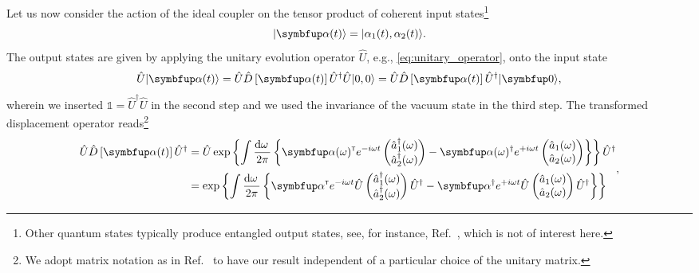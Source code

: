 Let us now consider the action of the ideal coupler on the tensor product of coherent input states\footnote{Other quantum states typically produce entangled output states, see, for instance, Ref.~\cite{Windhager2011}, which is not of interest here.}
\begin{equation}
	\ket*{\vb{\alpha}(t)}
	=
	\ket*{\alpha_1(t),\alpha_2(t)}
	.
\end{equation}
The output states are given by applying the unitary evolution operator $\hat{U}$, e.g., \cref{eq:unitary_operator}, onto the input state
\begin{equation}
	\hat{U}
	\ket*{\vb{\alpha}(t)}
	=
	\hat{U}
	\hat{D}\left[\vb{\alpha}(t)\right]
	\hat{U}^\dagger
	\hat{U}
	\ket*{0,0}
	=
	\hat{U}
	\hat{D}\left[\vb{\alpha}(t)\right]
	\hat{U}^\dagger
	\vacket
	,
\end{equation}
wherein we inserted $\mathbb{1}=\hat{U}^\dagger\hat{U}$ in the second step and we used the invariance of the vacuum state in the third step.
The transformed displacement operator reads\footnote{We adopt matrix notation as in Ref.~\cite[p.~206]{Vogel2006} to have our result independent of a particular choice of the unitary matrix.}
\begin{equation}
	\begin{split}
		\hat{U}
		\hat{D}\left[\vb{\alpha}(t)\right]
		\hat{U}^\dagger
		&=
		\hat{U}
		\exp\left\{
			\int\frac{\dd{\omega}}{2\pi}
			\left\{
				\vb{\alpha}(\omega)^\trans
				e^{-i\omega t}
				\begin{pmatrix}
					\hat{a}_1^\dagger(\omega) \\
					\hat{a}_2^\dagger(\omega)
				\end{pmatrix}
				-
				\vb{\alpha}(\omega)^\dagger
				e^{+i\omega t}
				\begin{pmatrix}
					\hat{a}_1(\omega) \\
					\hat{a}_2(\omega)
				\end{pmatrix}
			\right\}
		\right\}
		\hat{U}^\dagger
		\\
		&=
		\exp\left\{
			\int\frac{\dd{\omega}}{2\pi}
			\left\{
				\vb{\alpha}^\trans
				e^{-i\omega t}
				\hat{U}
				\begin{pmatrix}
					\hat{a}_1^\dagger(\omega) \\
					\hat{a}_2^\dagger(\omega)
				\end{pmatrix}
				\hat{U}^\dagger
				-
				\vb{\alpha}^\dagger
				e^{+i\omega t}
				\hat{U}
				\begin{pmatrix}
					\hat{a}_1(\omega) \\
					\hat{a}_2(\omega)
				\end{pmatrix}
				\hat{U}^\dagger
			\right\}
		\right\}
	\end{split}
	\label{eq:displacement_operator_transformed}
	,
\end{equation}
